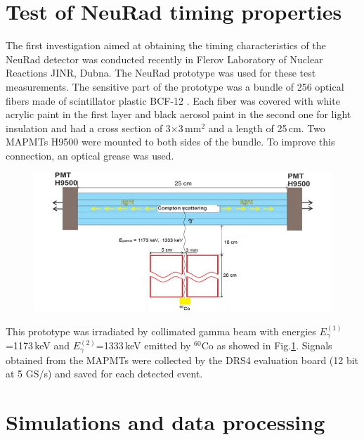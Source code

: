 \documentclass{webofc}
\begin{document}
\section{Test of NeuRad timing properties}

The first investigation aimed at obtaining the timing characteristics of the NeuRad detector was conducted recently in Flerov Laboratory of Nuclear Reactions JINR, Dubna. The NeuRad prototype was used for these test measurements. The sensitive part of the prototype was a bundle of 256 optical fibers made of scintillator plastic BCF-12 \cite{crystals}. 
Each fiber was covered with white acrylic paint in the first layer and black aerosol paint in the second one for light insulation and had a cross section of 3$\times$3\,mm$^2$ and a length of 25\,cm. Two MAPMTs H9500 \cite{hm} were mounted to both sides of the bundle. To improve this connection, an optical grease was used.

\begin{figure}[h]
	\centering
	\includegraphics[width=0.7\linewidth]{NeuRadexperiment.png}
\label{ris:neuradexp}
\end{figure}

This prototype was irradiated by collimated gamma beam with energies $E^{(1)}_{\gamma}$=1173\,keV and $E^{(2)}_{\gamma}$=1333\,keV emitted by $^{60}$Co as showed in Fig.\ref{ris:neuradexp}. Signals obtained from the MAPMTs were collected by the DRS4 evaluation board (12 bit at 5 GS/s) and
saved for each detected event.

\section{Simulations and data processing}
\end{document}
